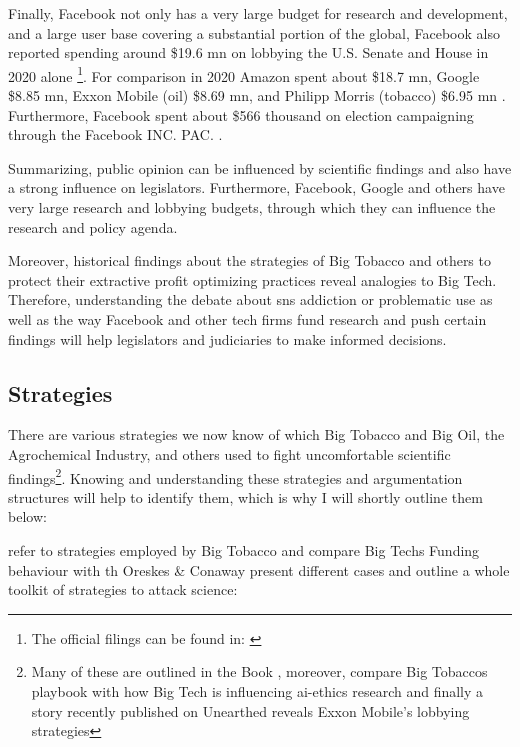 Finally, Facebook not only has a very large budget for research and development, and a large user base covering a  substantial portion of the global, Facebook also reported spending around \$19.6 \gls{mn}  on lobbying the U.S. Senate and House in 2020 alone \citep{opensecrets_facebook_2021-1}\footnote{The official filings can be found in: \citep{maurer_ld-2_2020-2, maurer_ld-2_2020-1, maurer_ld-2_2020, maurer_ld-2_2021}}.
For comparison in 2020 Amazon spent about \$18.7 \gls{mn}, Google \$8.85 \gls{mn}, Exxon Mobile (oil) \$8.69 \gls{mn}, and Philipp Morris (tobacco) \$6.95 \gls{mn} \citep{khaled_facebook_2021, opensecrets_amazoncom_2021, opensecrets_alphabet_2021, opensecrets_exxon_2021, opensecrets_philip_2021}.
Furthermore, Facebook spent about \$566 thousand on election campaigning through the Facebook INC. PAC. \citep{opensecrets_facebook_2021}.

Summarizing, public opinion can be influenced by scientific findings and also have a strong influence on legislators. Furthermore, Facebook, Google and others have very large research and lobbying budgets, through which they can influence the research and policy agenda. 

Moreover, historical findings about the strategies of Big Tobacco and others to protect their extractive profit optimizing practices reveal analogies to Big Tech.
Therefore, understanding the debate about \gls{sns} addiction or problematic use as well as the way Facebook and other tech firms fund research and push certain findings  will help legislators and judiciaries to make informed decisions.


\subsection{Strategies}
There are various strategies we now know of which Big Tobacco and Big Oil, the Agrochemical Industry, and others used to fight uncomfortable scientific findings\footnote{Many of these are outlined in the Book  \citep{oreskes_merchants_2010}, moreover, \citep{abdalla_grey_2021} compare Big Tobaccos playbook with how Big Tech is influencing \gls{ai}-ethics research and  finally a story recently published on Unearthed reveals Exxon Mobile's lobbying strategies }.
Knowing and understanding these strategies and argumentation structures will help to identify them, which is why I will shortly outline them below:


refer to strategies employed by Big Tobacco and compare Big Techs Funding behaviour with th
Oreskes \& Conaway present different cases and outline a whole toolkit of strategies to attack science:


